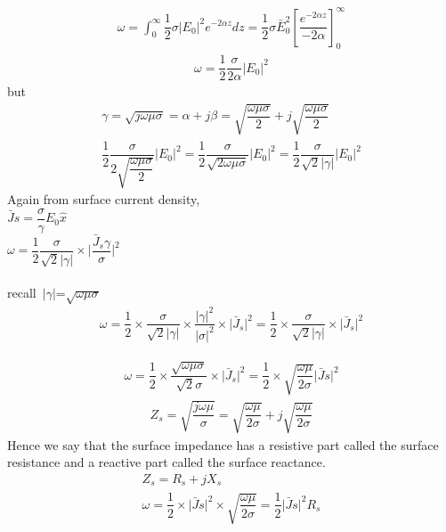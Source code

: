 \begin{align}
\omega=\int_{0}^{\infty}\dfrac{1}{2}\sigma\lvert E_{0}\rvert^{2}\textit{e}^{-2\alpha z}dz=\dfrac{1}{2}\sigma\bar{E}_{0}^{2}[\dfrac{\textit{e}^{-2\alpha z}}{-2\alpha}]_{0}^{\infty}
\end{align}
\begin{align}
\omega=\dfrac{1}{2}\dfrac{\sigma}{2\alpha}\lvert E_{0}\rvert^{2}
\end{align}
but
\begin{align}
\gamma=\sqrt{j\omega\mu\sigma}=\alpha+j\beta=\sqrt{\dfrac{\omega\mu\sigma}{2}}+j\sqrt{\dfrac{\omega\mu\sigma}{2}}\\
\dfrac{1}{2}\dfrac{\sigma}{2\sqrt{\dfrac{\omega\mu\sigma}{2}}}\lvert E_{0}\rvert^{2}=\dfrac{1}{2}\dfrac{\sigma}{\sqrt{2\omega\mu\sigma}}\lvert E_{0}\rvert^{2}=\dfrac{1}{2}\dfrac{\sigma}{\sqrt{2}\lvert\gamma\rvert}\lvert E_{0}\rvert^{2}
\end{align}
Again from surface current density,\\
$\bar{J}s=\dfrac{\sigma}{\gamma}E_{0}\hat{x}$\\
$\omega=\dfrac{1}{2}\dfrac{\sigma}{\sqrt{2}\lvert\gamma\rvert}\times \lvert\dfrac{\bar{J}_{s}\gamma}{\sigma}\rvert^{2}$\\\\
recall\ $\lvert$$\gamma$$\rvert$=$\sqrt{\omega\mu\sigma}$
\begin{align}
\omega=\dfrac{1}{2}\times \dfrac{\sigma}{\sqrt{2}\lvert\gamma\rvert}\times \dfrac{\lvert\gamma\rvert^{2}}{\lvert\sigma\rvert^{2}}\times \lvert\bar{J}_{s}\rvert^{2}=\dfrac{1}{2}\times \dfrac{\sigma}{\sqrt{2}\lvert\gamma\rvert}\times \lvert\bar{J}_{s}\rvert^{2}
\end{align}

\begin{align}
\omega=\dfrac{1}{2}\times \dfrac{\sqrt{\omega\mu\sigma}}{\sqrt{2}\sigma}\times \lvert\bar{J}_{s}\rvert^{2}=\dfrac{1}{2}\times \sqrt{\dfrac{\omega\mu}{2\sigma}}\lvert\bar{J}s\rvert^{2}
\end{align}
\begin{align}
Z_{s}=\sqrt{\dfrac{j\omega\mu}{\sigma}}=\sqrt{\dfrac{\omega\mu}{2\sigma}}+j\sqrt{\dfrac{\omega\mu}{2\sigma}}
\end{align}
Hence we say that the surface impedance has a resistive part called the surface resistance and a reactive part called the surface reactance.\\
\begin{align}
Z_{s}=R_{s}+jX_{s}\\	
\omega=\dfrac{1}{2}\times \lvert\bar{J}s\rvert^{2}\times \sqrt{\dfrac{\omega\mu}{2\sigma}}=\dfrac{1}{2}\lvert\bar{J}s\rvert^{2}R_{s}
\end{align}

